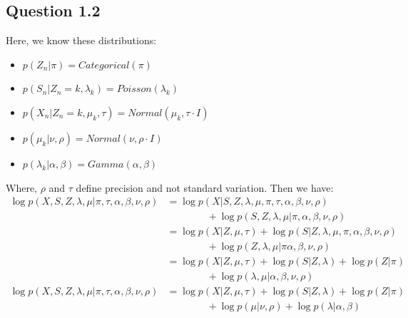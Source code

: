 \documentclass{article}
\begin{document}
\subsection{Question 1.2}

Here, we know these distributions:
\begin{itemize}
  \item $p(Z_n|\pi) = Categorical(\pi)$
  \item $p(S_n|Z_n = k, \lambda_k) = Poisson(\lambda_k)$
  \item $p(X_n|Z_n = k, \mu_k, \tau) = Normal(\mu_k, \tau \cdot I)$
  \item $p(\mu_k|\nu,\rho) = Normal(\nu, \rho \cdot I)$
  \item $p(\lambda_k|\alpha, \beta) = Gamma(\alpha, \beta)$
\end{itemize}
Where, $\rho$ and $\tau$ define precision and not standard variation. Then we have:
\begin{equation}
  \begin{split}
    \log p(X,S,Z,\lambda,\mu|\pi,\tau,\alpha,\beta,\nu,\rho) & = \log p(X|S,Z,\lambda,\mu,\pi,\tau,\alpha,\beta,\nu,\rho)                 \\
                                                             & \qquad\qquad + \log p(S,Z,\lambda,\mu|\pi,\alpha,\beta,\nu,\rho)           \\
                                                             & = \log p(X|Z,\mu,\tau) + \log p(S|Z,\lambda,\mu,\pi,\alpha,\beta,\nu,\rho) \\
                                                             & \qquad\qquad + \log p(Z,\lambda,\mu|\pi\alpha,\beta,\nu,\rho)              \\
                                                             & = \log p(X|Z,\mu,\tau) + \log p(S|Z,\lambda) + \log p(Z|\pi)               \\
                                                             & \qquad\qquad + \log p(\lambda,\mu|\alpha,\beta,\nu,\rho)                   \\
    \log p(X,S,Z,\lambda,\mu|\pi,\tau,\alpha,\beta,\nu,\rho) & = \log p(X|Z,\mu,\tau) + \log p(S|Z,\lambda) + \log p(Z|\pi)               \\
                                                             & \qquad\qquad + \log p(\mu|\nu,\rho) + \log p(\lambda|\alpha,\beta)         \\
  \end{split}
\end{equation}
\end{document}
